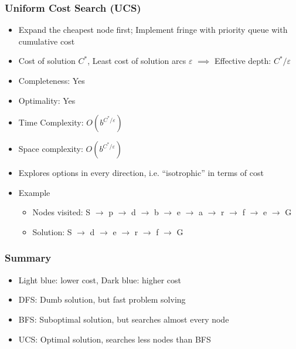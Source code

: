 \subsubsection*{Uniform Cost Search (UCS)}
\begin{itemize}
    \item Expand the cheapest node first; Implement fringe with priority queue with cumulative cost
    \item Cost of solution $C^\ast$, Least cost of solution arcs $\varepsilon$ $\implies$ Effective depth: $C^\ast/\varepsilon$
    \item Completeness: Yes
    \item Optimality: Yes
    \item Time Complexity: $O(b^{C^\ast/\varepsilon})$
    \item Space complexity: $O(b^{C^\ast/\varepsilon})$
    \item Explores options in every direction, i.e. ``isotrophic'' in terms of cost
    \item Example
    \begin{itemize}
        \item Nodes visited: S $\to$ p $\to$ d $\to$ b $\to$ e $\to$ a $\to$ r $\to$ f $\to$ e $\to$ G
        \item Solution: S $\to$ d $\to$ e $\to$ r $\to$ f $\to$ G
    \end{itemize}
\end{itemize}
\begin{figures}
\end{figures}

\subsubsection*{Summary}
\begin{itemize}
    \item Light blue: lower cost, Dark blue: higher cost
    \item DFS: Dumb solution, but fast problem solving
    \item BFS: Suboptimal solution, but searches almost every node
    \item UCS: Optimal solution, searches less nodes than BFS
\end{itemize}
\begin{figures}
\end{figures}

